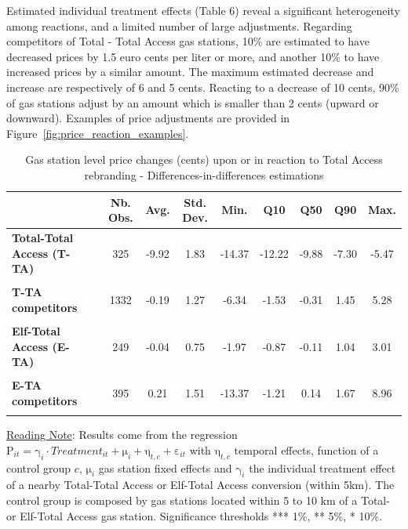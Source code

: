\documentclass[english]{article}
\begin{document}
Estimated individual treatment effects (Table 6) reveal a significant heterogeneity among reactions, and a limited number of large adjustments. Regarding competitors of Total - Total Access gas stations, 10\% are estimated to have decreased prices by 1.5 euro cents per liter or more, and another 10\% to have increased prices by a similar amount. The maximum estimated decrease and increase are respectively of 6 and 5 cents. Reacting to a decrease of 10 cents, 90\% of gas stations adjust by an amount which is smaller than 2 cents (upward or downward). Examples of price adjustments are provided in Figure~\ref{fig:price_reaction_examples}.

\begin{table}
\caption{Gas station level price changes (cents) upon or in reaction to Total Access rebranding - Differences-in-differences estimations}
\label{tab:gas_station_level_changes_dd_regs}
\begin{threeparttable}
\begin{scriptsize}
\begin{tabular}{llcccccccc}
\hline
\hline
 &  & \textbf{Nb. Obs.}  & \textbf{Avg.}  & \textbf{Std. Dev.}  & \textbf{Min.}  & \textbf{Q10}  & \textbf{Q50}  & \textbf{Q90}  & \textbf{Max.}\tabularnewline
\hline
\textbf{Total-Total Access (T-TA)}  &  & 325  & -9.92  & 1.83  & -14.37  & -12.22  & -9.88  & -7.30  & -5.47\tabularnewline
 &  &  &  &  &  &  &  &  & \tabularnewline
\textbf{T-TA competitors}  &  & 1332  & -0.19  & 1.27  & -6.34  & -1.53  & -0.31  & 1.45  & 5.28\tabularnewline
 &  &  &  &  &  &  &  &  & \tabularnewline
\hline
\textbf{Elf-Total Access (E-TA)}  &  & 249  & -0.04  & 0.75  & -1.97  & -0.87  & -0.11  & 1.04  & 3.01\tabularnewline
 &  &  &  &  &  &  &  &  & \tabularnewline
\textbf{E-TA competitors}  &  & 395  & 0.21  & 1.51  & -13.37  & -1.21  & 0.14  & 1.67  & 8.96\tabularnewline
 &  &  &  &  &  &  &  &  & \tabularnewline
\hline
\hline
\end{tabular}
\end{scriptsize}
\end{threeparttable}
\parbox{\textwidth}{\small%
\vspace{2eX} %
{\small{}\uline{Reading Note}}{\small{}:} Results come from the regression $\mathrm{P}_{it}=\mathrm{\gamma}_{i}\cdot Treatment_{it}+\mathrm{\mu}_{i}+\mathrm{\eta}_{t,c}+\mathrm{\varepsilon}_{it}$ with $\mathrm{\eta}_{t,c}$ temporal effects, function of a control group $c$, $\mathrm{\mu}_{i}$ gas station fixed effects and $\mathrm{\gamma}_{i}$ the individual treatment effect of a nearby Total-Total Access or Elf-Total Access conversion (within 5km). The control group is composed by gas stations located within 5 to 10 km of a Total- or Elf-Total Access gas station. Significance thresholds {*}{*}{*} 1\%, {*}{*} 5\%, {*} 10\%.}
\end{table}
\end{document}
